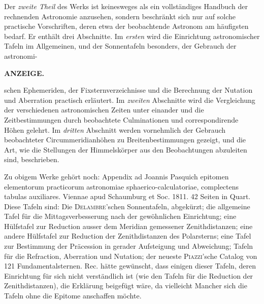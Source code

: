 Der \emph{zweite Theil} des Werks ist keinesweges als ein vollständiges Handbuch der rechnenden Astronomie anzusehen, sondern beschränkt sich nur auf solche practische Vorschriften, deren etwa der beobachtende Astronom am häufigsten bedarf. Er enthält drei Abschnitte. Im \emph{ersten} wird die Einrichtung astronomischer Tafeln im Allgemeinen, und der Sonnentafeln besonders, der Gebrauch der astronomi-\par
\clearpage
{}
\noindent{}%
\parbox[b]{\dimexpr\textwidth-20mm\relax}{\centering\small\textbf{ANZEIGE.}}%
\makebox[10mm][r]{}\par\nobreak\medskip
\noindent schen Ephemeriden, der Fixsternverzeichnisse und die Berechnung der Nutation und Aberration practisch erläutert. Im \emph{zweiten} Abschnitte wird die Vergleichung der verschiedenen astronomischen Zeiten unter einander und die Zeitbestimmungen durch beobachtete Culminationen und correspondirende Höhen gelehrt. Im \emph{dritten} Abschnitt werden vornehmlich der Gebrauch beobachteter Circummeridianhöhen zu Breitenbestimmungen gezeigt, und die Art, wie die Stellungen der Himmelskörper aus den Beobachtungen abzuleiten sind, beschrieben.

Zu obigem Werke gehört noch: Appendix ad Joannis Pasquich epitomen elementorum practicorum astronomiae sphaerico-calculatoriae, complectens tabulas auxiliares. Viennae apud Schaumburg et Soc. 1811. 42 Seiten in Quart. Diese Tafeln sind: Die \textsc{Delambre}'schen Sonnentafeln, abgekürzt; die allgemeine Tafel für die Mittagsverbesserung nach der gewöhnlichen Einrichtung; eine Hülfstafel zur Reduction ausser dem Meridian gemessener Zenithdistanzen; eine andere Hülfstafel zur Reduction der Zenithdistanzen des Polarsterns; eine Tafel zur Bestimmung der Präcession in gerader Aufsteigung und Abweichung; Tafeln für die Refraction, Aberration und Nutation; der neueste \textsc{Piazzi}'sche Catalog von 121 Fundamentalsternen. Rec. hätte gewünscht, dass einigen dieser Tafeln, deren Einrichtung für sich nicht verständlich ist (wie den Tafeln für die Reduction der Zenithdistanzen), die Erklärung beigefügt wäre, da vielleicht Mancher sich die Tafeln ohne die Epitome anschaffen möchte.
